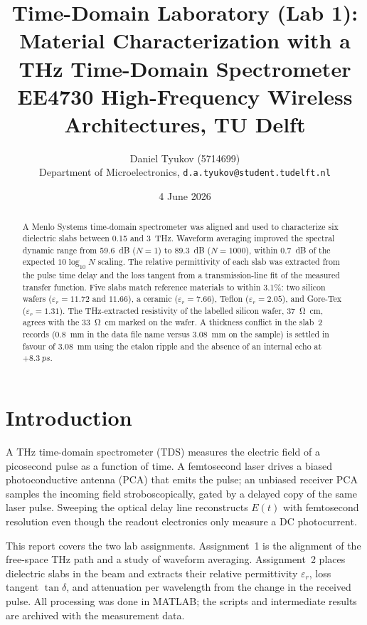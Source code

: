 \documentclass[10pt,a4paper]{article}
\title{\vspace{-1.2em}Time-Domain Laboratory (Lab 1):\\
Material Characterization with a THz Time-Domain Spectrometer\\
\large EE4730 High-Frequency Wireless Architectures, TU Delft}
\author{Daniel Tyukov (5714699)\\
\small Department of Microelectronics, \texttt{d.a.tyukov@student.tudelft.nl}}
\date{4 June 2026}
\begin{document}
\maketitle
\vspace{-1.5em}

\begin{abstract}
\noindent
A Menlo Systems time-domain spectrometer was aligned and used to characterize six dielectric slabs between 0.15 and \qty{3}{THz}. Waveform averaging improved the spectral dynamic range from \qty{59.6}{dB} ($N=1$) to \qty{89.3}{dB} ($N=1000$), within \qty{0.7}{dB} of the expected $10\log_{10}N$ scaling. The relative permittivity of each slab was extracted from the pulse time delay and the loss tangent from a transmission-line fit of the measured transfer function. Five slabs match reference materials to within 3.1\%: two silicon wafers ($\varepsilon_r = 11.72$ and $11.66$), a ceramic ($\varepsilon_r = 7.66$), Teflon ($\varepsilon_r = 2.05$), and Gore-Tex ($\varepsilon_r = 1.31$). The THz-extracted resistivity of the labelled silicon wafer, \qty{37}{\ohm\centi\meter}, agrees with the \qty{33}{\ohm\centi\meter} marked on the wafer. A thickness conflict in the slab~2 records (\qty{0.8}{mm} in the data file name versus \qty{3.08}{mm} on the sample) is settled in favour of \qty{3.08}{mm} using the etalon ripple and the absence of an internal echo at $+\qty{8.3}{ps}$.
\end{abstract}

\section{Introduction}

A THz time-domain spectrometer (TDS) measures the electric field of a picosecond pulse as a function of time. A femtosecond laser drives a biased photoconductive antenna (PCA) that emits the pulse; an unbiased receiver PCA samples the incoming field stroboscopically, gated by a delayed copy of the same laser pulse. Sweeping the optical delay line reconstructs $E(t)$ with femtosecond resolution even though the readout electronics only measure a DC photocurrent.

This report covers the two lab assignments. Assignment~1 is the alignment of the free-space THz path and a study of waveform averaging. Assignment~2 places dielectric slabs in the beam and extracts their relative permittivity $\varepsilon_r$, loss tangent $\tan\delta$, and attenuation per wavelength from the change in the received pulse. All processing was done in MATLAB; the scripts and intermediate results are archived with the measurement data.
\end{document}
